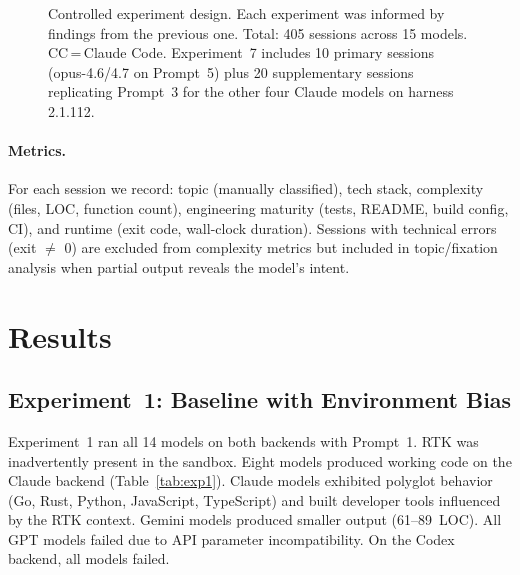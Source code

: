 \documentclass{article}
\begin{document}
\begin{figure}[t]
\caption{Controlled experiment design. Each experiment was
  informed by findings from the previous one. Total: 405
  sessions across 15 models. CC\,=\,Claude Code.
  Experiment~7 includes 10 primary sessions (opus-4.6/4.7 on
  Prompt~5) plus 20 supplementary sessions replicating Prompt~3
  for the other four Claude models on harness 2.1.112.}
\label{fig:matrix}
\end{figure}

\paragraph{Metrics.}
For each session we record: topic (manually classified), tech
stack, complexity (files, LOC, function count), engineering
maturity (tests, README, build config, CI), and runtime (exit
code, wall-clock duration). Sessions with technical errors (exit
$\neq$ 0) are excluded from complexity metrics but included in
topic/fixation analysis when partial output reveals the model's
intent.

\section{Results}
\label{sec:results}

\subsection{Experiment~1: Baseline with Environment Bias}

Experiment~1 ran all 14 models on both backends with Prompt~1.
RTK was inadvertently present in the sandbox.
Eight models produced working code on the Claude backend
(Table~\ref{tab:exp1}). Claude models exhibited polyglot behavior
(Go, Rust, Python, JavaScript, TypeScript) and built developer
tools influenced by the RTK context. Gemini models produced
smaller output (61--89~LOC). All GPT models failed due to API
parameter incompatibility. On the Codex backend, all models
failed.
\end{document}
